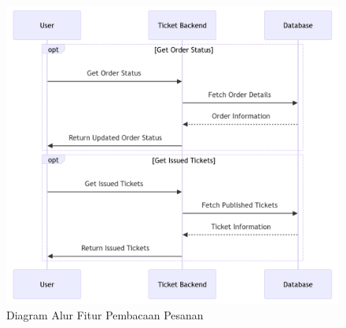 \begin{figure}[H]
    \centering
    \includegraphics[width=1\textwidth]{resources/chapter-3/order-flow.png}
    \caption{Diagram Alur Fitur Pembacaan Pesanan}
    \label{fig:flow-order-flow}
\end{figure}
